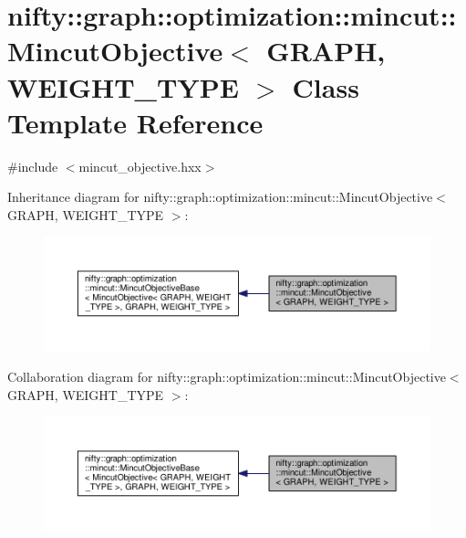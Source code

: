 \hypertarget{classnifty_1_1graph_1_1optimization_1_1mincut_1_1MincutObjective}{}\section{nifty\+:\+:graph\+:\+:optimization\+:\+:mincut\+:\+:Mincut\+Objective$<$ G\+R\+A\+P\+H, W\+E\+I\+G\+H\+T\+\_\+\+T\+Y\+P\+E $>$ Class Template Reference}
\label{classnifty_1_1graph_1_1optimization_1_1mincut_1_1MincutObjective}


{\ttfamily \#include $<$mincut\+\_\+objective.\+hxx$>$}



Inheritance diagram for nifty\+:\+:graph\+:\+:optimization\+:\+:mincut\+:\+:Mincut\+Objective$<$ G\+R\+A\+P\+H, W\+E\+I\+G\+H\+T\+\_\+\+T\+Y\+P\+E $>$\+:\nopagebreak
\begin{figure}[H]
\begin{center}
\leavevmode
\includegraphics[width=350pt]{classnifty_1_1graph_1_1optimization_1_1mincut_1_1MincutObjective__inherit__graph}
\end{center}
\end{figure}


Collaboration diagram for nifty\+:\+:graph\+:\+:optimization\+:\+:mincut\+:\+:Mincut\+Objective$<$ G\+R\+A\+P\+H, W\+E\+I\+G\+H\+T\+\_\+\+T\+Y\+P\+E $>$\+:\nopagebreak
\begin{figure}[H]
\begin{center}
\leavevmode
\includegraphics[width=350pt]{classnifty_1_1graph_1_1optimization_1_1mincut_1_1MincutObjective__coll__graph}
\end{center}
\end{figure}

